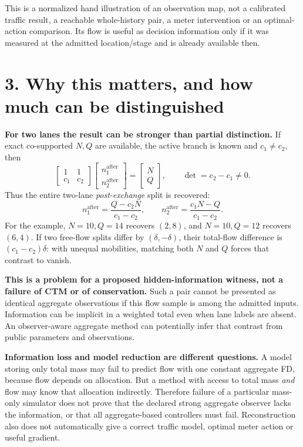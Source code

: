 \documentclass[11pt]{article}
\begin{document}
This is a normalized hand illustration of an observation map, not a calibrated
traffic result, a reachable whole-history pair, a meter intervention or an
optimal-action comparison. Its flow is useful as decision information only if
it was measured at the admitted location/stage and is already available then.

\newpage
\section*{3. Why this matters, and how much can be distinguished}
\textbf{For two lanes the result can be stronger than partial distinction.}
If exact co-supported \(N,Q\) are available, the active branch is known and
\(c_1\ne c_2\), then
\[
 \begin{bmatrix}1&1\\c_1&c_2\end{bmatrix}
 \begin{bmatrix}n_1^{\mathrm{after}}\\n_2^{\mathrm{after}}\end{bmatrix}
 =\begin{bmatrix}N\\Q\end{bmatrix},\qquad
 \det=c_2-c_1\ne0.
\]
Thus the entire two-lane \emph{post-exchange} split is recovered:
\[
 n_1^{\mathrm{after}}=\frac{Q-c_2N}{c_1-c_2},\qquad
 n_2^{\mathrm{after}}=\frac{c_1N-Q}{c_1-c_2}.
\]
For the example, \(N=10,Q=14\) recovers \((2,8)\), and \(N=10,Q=12\)
recovers \((6,4)\). If two free-flow splits differ by \((\delta,-\delta)\),
their total-flow difference is \((c_1-c_2)\delta\): with unequal mobilities,
matching both \(N\) and \(Q\) forces that contrast to vanish.

\textbf{This is a problem for a proposed hidden-information witness, not a
failure of CTM or of conservation.} Such a pair cannot be presented as identical
aggregate observations if this flow sample is among the admitted inputs.
Information can be implicit in a weighted total even when lane labels are absent.
An observer-aware aggregate method can potentially infer that contrast from
public parameters and observations.

\textbf{Information loss and model reduction are different questions.}
A model storing only total mass may fail to predict flow with one constant
aggregate FD, because flow depends on allocation. But a method with access to
total mass \emph{and} flow may know that allocation indirectly. Therefore failure
of a particular mass-only simulator does not prove that the declared strong
aggregate observer lacks the information, or that all aggregate-based controllers
must fail. Reconstruction also does not automatically give a correct traffic
model, optimal meter action or useful gradient.
\end{document}
